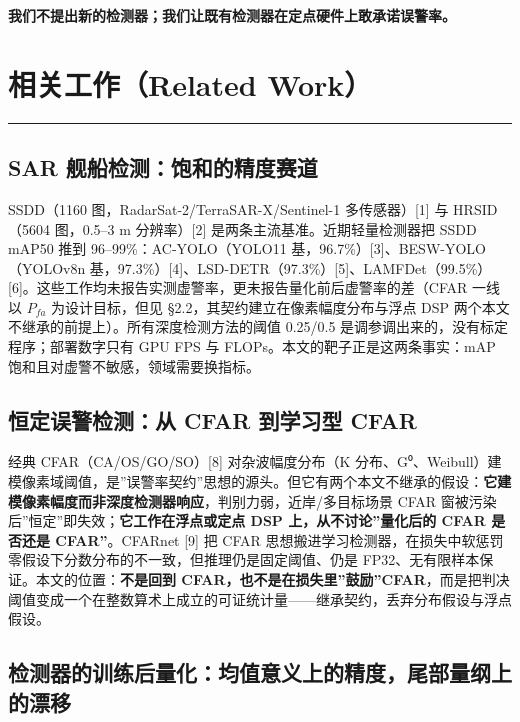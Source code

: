 \textbf{我们不提出新的检测器；我们让既有检测器在定点硬件上敢承诺误警率。}

\section{相关工作（Related
Work）}\label{ux76f8ux5173ux5de5ux4f5crelated-work}

\begin{center}\rule{0.5\linewidth}{0.5pt}\end{center}

\subsection{SAR
舰船检测：饱和的精度赛道}\label{sar-ux8230ux8239ux68c0ux6d4bux9971ux548cux7684ux7cbeux5ea6ux8d5bux9053}

SSDD（1160 图，RadarSat-2/TerraSAR-X/Sentinel-1 多传感器）{[}1{]} 与
HRSID（5604 图，0.5--3 m 分辨率）{[}2{]}
是两条主流基准。近期轻量检测器把 SSDD mAP50 推到
96--99\%：AC-YOLO（YOLO11 基，96.7\%）{[}3{]}、BESW-YOLO（YOLOv8n
基，97.3\%）{[}4{]}、LSD-DETR（97.3\%）{[}5{]}、LAMFDet（99.5\%）{[}6{]}。这些工作均未报告实测虚警率，更未报告量化前后虚警率的差（CFAR
一线以 \(P_{fa}\) 为设计目标，但见 §2.2，其契约建立在像素幅度分布与浮点
DSP 两个本文不继承的前提上）。所有深度检测方法的阈值 0.25/0.5
是调参调出来的，没有标定程序；部署数字只有 GPU FPS 与
FLOPs。本文的靶子正是这两条事实：mAP
饱和且对虚警不敏感，领域需要换指标。

\subsection{恒定误警检测：从 CFAR 到学习型
CFAR}\label{ux6052ux5b9aux8befux8b66ux68c0ux6d4bux4ece-cfar-ux5230ux5b66ux4e60ux578b-cfar}

经典 CFAR（CA/OS/GO/SO）{[}8{]} 对杂波幅度分布（K
分布、G⁰、Weibull）建模像素域阈值，是''误警率契约''思想的源头。但它有两个本文不继承的假设：\textbf{它建模像素幅度而非深度检测器响应}，判别力弱，近岸/多目标场景
CFAR 窗被污染后''恒定''即失效；\textbf{它工作在浮点或定点 DSP
上，从不讨论''量化后的 CFAR 是否还是 CFAR''}。CFARnet {[}9{]} 把 CFAR
思想搬进学习检测器，在损失中软惩罚零假设下分数分布的不一致，但推理仍是固定阈值、仍是
FP32、无有限样本保证。本文的位置：\textbf{不是回到
CFAR，也不是在损失里''鼓励''CFAR}，而是把判决阈值变成一个在整数算术上成立的可证统计量------继承契约，丢弃分布假设与浮点假设。

\subsection{检测器的训练后量化：均值意义上的精度，尾部量纲上的漂移}\label{ux68c0ux6d4bux5668ux7684ux8badux7ec3ux540eux91cfux5316ux5747ux503cux610fux4e49ux4e0aux7684ux7cbeux5ea6ux5c3eux90e8ux91cfux7eb2ux4e0aux7684ux6f02ux79fb}

